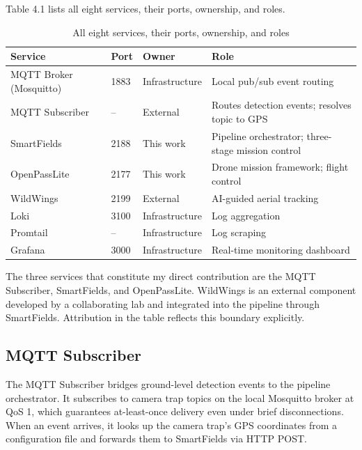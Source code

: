 Table 4.1 lists all eight services, their ports, ownership, and roles.

\begin{table}
\centering
\caption{All eight services, their ports, ownership, and roles}
\small
\renewcommand{\arraystretch}{1.3}
\begin{tabularx}{\textwidth}{l l l X}
\hline
\textbf{Service} & \textbf{Port} & \textbf{Owner} & \textbf{Role} \\
\hline

MQTT Broker (Mosquitto)
& 1883
& Infrastructure
& Local pub/sub event routing \\
\hline

MQTT Subscriber
& --
& External
& Routes detection events; resolves topic to GPS \\
\hline

SmartFields
& 2188
& This work
& Pipeline orchestrator; three-stage mission control \\
\hline

OpenPassLite
& 2177
& This work
& Drone mission framework; flight control \\
\hline

WildWings
& 2199
& External \cite{kline2025wildwing}
& AI-guided aerial tracking \\
\hline

Loki
& 3100
& Infrastructure
& Log aggregation \\
\hline

Promtail
& --
& Infrastructure
& Log scraping \\
\hline

Grafana
& 3000
& Infrastructure
& Real-time monitoring dashboard \\
\hline

\end{tabularx}
\end{table}

The three services that constitute my direct contribution are the MQTT Subscriber, SmartFields, and OpenPassLite. WildWings is an external component developed by a collaborating lab and integrated into the pipeline through SmartFields. Attribution in the table reflects this boundary explicitly.

\subsection{MQTT Subscriber}
\label{subsec:ch4_ltt}
The MQTT Subscriber bridges ground-level detection events to the pipeline orchestrator. It subscribes to camera trap topics on the local Mosquitto broker at QoS 1, which guarantees at-least-once delivery even under brief disconnections. When an event arrives, it looks up the camera trap's GPS coordinates from a configuration file and forwards them to SmartFields via HTTP POST.

